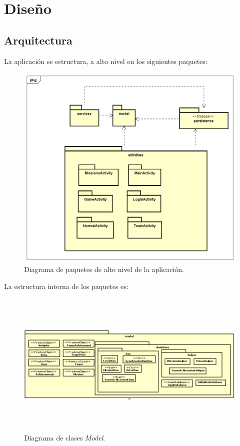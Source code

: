 \documentclass[twoside]{report}
\begin{document}
\section{Diseño}
\subsection{Arquitectura}
La aplicación se estructura, a alto nivel en los siguientes paquetes:
\begin{figure}[H]
\centering
\includegraphics[scale=0.5]{images/structureHighLevel}
\caption{Diagrama de paquetes de alto nivel de la aplicación.}
\end{figure}

\clearpage

La estructura interna de los paquetes es:

\begin{figure}[H]
\centering
\includegraphics[height=7cm,width=\textwidth]{images/structureModel.PNG}
\caption{Diagrama de clases \textit{Model}.}
\end{figure}
\end{document}
